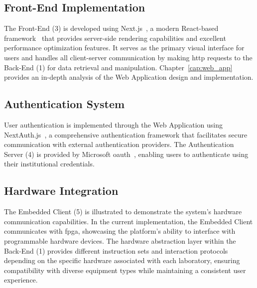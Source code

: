 \subsection*{Front-End Implementation}
The Front-End (3) is developed using Next.js~\cite{nextjs-docs}, a modern React-based framework~\cite{react} that provides server-side rendering capabilities and excellent performance optimization features. It serves as the primary visual interface for users and handles all client-server communication by making \acs{http} requests to the Back-End (1) for data retrieval and manipulation. Chapter~\ref{cap:web_app} provides an in-depth analysis of the Web Application design and implementation.

\subsection*{Authentication System}
User authentication is implemented through the Web Application using NextAuth.js~\cite{nextjs-authentication}, a comprehensive authentication framework that facilitates secure communication with external authentication providers. The Authentication Server (4) is provided by Microsoft \ac{oauth}~\cite{microsoft-oauth}, enabling users to authenticate using their institutional credentials.

\subsection*{Hardware Integration}
The Embedded Client (5) is illustrated to demonstrate the system's hardware communication capabilities. In the current implementation, the Embedded Client communicates with \ac{fpga}, showcasing the platform's ability to interface with programmable hardware devices. The hardware abstraction layer within the Back-End (1) provides different instruction sets and interaction protocols depending on the specific hardware associated with each laboratory, ensuring compatibility with diverse equipment types while maintaining a consistent user experience.